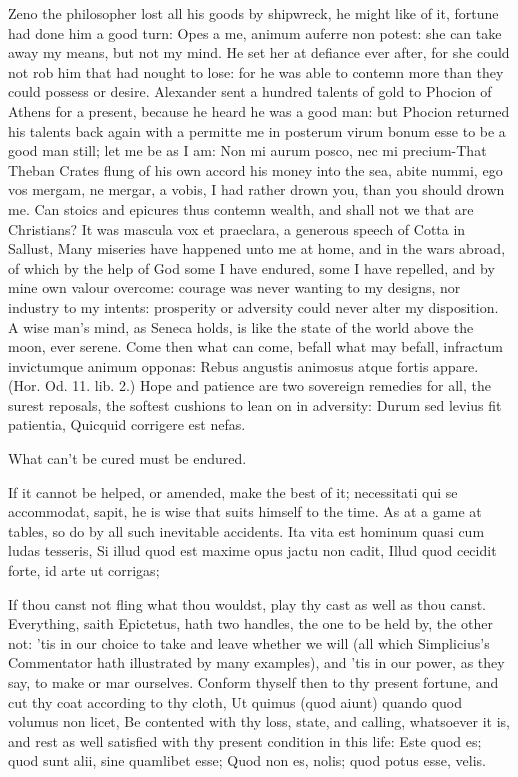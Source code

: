 {Zeno the philosopher lost all his goods by shipwreck, he might
like of it, fortune had done him a good turn: Opes a me, animum auferre
non potest: she can take away my means, but not my mind. He set her at
defiance ever after, for she could not rob him that had nought to lose:
for he was able to contemn more than they could possess or desire.
Alexander sent a hundred talents of gold to Phocion of Athens for a
present, because he heard he was a good man: but Phocion returned his
talents back again with a permitte me in posterum virum bonum esse to
be a good man still; let me be as I am: Non mi aurum posco, nec mi
precium-That Theban Crates flung of his own accord his money into
the sea, abite nummi, ego vos mergam, ne mergar, a vobis, I had rather
drown you, than you should drown me. Can stoics and epicures thus
contemn wealth, and shall not we that are Christians? It was mascula
vox et praeclara, a generous speech of Cotta in Sallust, Many
miseries have happened unto me at home, and in the wars abroad, of
which by the help of God some I have endured, some I have repelled, and
by mine own valour overcome: courage was never wanting to my designs,
nor industry to my intents: prosperity or adversity could never alter
my disposition. A wise man's mind, as Seneca holds,  is like the
state of the world above the moon, ever serene. Come then what can
come, befall what may befall, infractum invictumque  animum
opponas: Rebus angustis animosus atque fortis appare. (Hor. Od. 11.
lib. 2.) Hope and patience are two sovereign remedies for all, the
surest reposals, the softest cushions to lean on in adversity:
Durum sed levius fit patientia,
Quicquid corrigere est nefas.

What can't be cured must be endured.

If it cannot be helped, or amended, make the best of it; 
necessitati qui se accommodat, sapit, he is wise that suits himself to
the time. As at a game at tables, so do by all such inevitable
accidents.
Ita vita est hominum quasi cum ludas tesseris,
Si illud quod est maxime opus jactu non cadit,
Illud quod cecidit forte, id arte ut corrigas;

If thou canst not fling what thou wouldst, play thy cast as well as
thou canst. Everything, saith Epictetus, hath two handles, the
one to be held by, the other not: 'tis in our choice to take and leave
whether we will (all which Simplicius's Commentator hath illustrated by
many examples), and 'tis in our power, as they say, to make or mar
ourselves. Conform thyself then to thy present fortune, and cut thy
coat according to thy cloth, Ut quimus (quod aiunt) quando quod
volumus non licet, Be contented with thy loss, state, and calling,
whatsoever it is, and rest as well satisfied with thy present condition
in this life:
Este quod es; quod sunt alii, sine quamlibet esse;
Quod non es, nolis; quod potus esse, velis.

}
